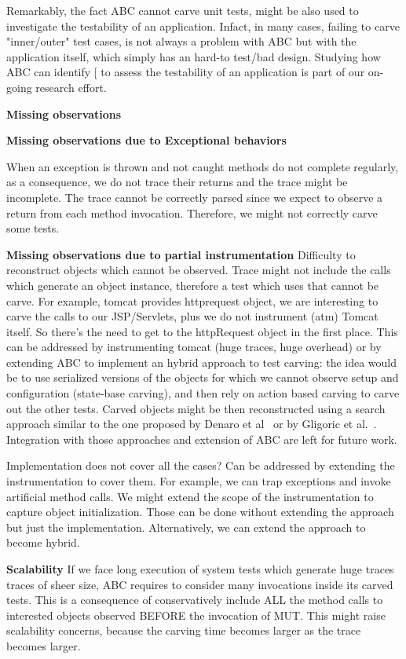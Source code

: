 \documentclass[10pt,conference]{IEEEtran}
\makeatletter
\gdef\xxx{\@ifnextchar[\xxx@lab\xxx@nolab}
\newcommand{\abc}{\textsf{ABC}\xspace}
\makeatother
\begin{document}
{Remarkably, the fact \abc cannot carve unit tests, might be also used to investigate the testability of an application. Infact, in many cases, failing to carve "inner/outer" test cases, is not always a problem with \abc but with the application itself, which simply has an hard-to test/bad design. Studying how \abc can identify \xxx{code smells} to assess the testability of an application is part of our on-going research effort.

\textbf{Missing observations}

\textbf{Missing observations due to Exceptional behaviors}

When an exception is thrown and not caught methods do not complete regularly, as a consequence, we do not trace their returns and the trace might be incomplete. The trace cannot be correctly parsed since we expect to observe a return from each method invocation.  Therefore, we might not correctly carve some tests.

\textbf{Missing observations due to partial instrumentation}
Difficulty to reconstruct objects which cannot be observed. Trace might not include the calls which generate an object instance, therefore a test which uses that cannot be carve. For example, tomcat provides httprequest object, we are interesting to carve the calls to our JSP/Servlets, plus we do not instrument (atm) Tomcat itself. So there's the need to get to the httpRequest object in the first place. This can be addressed by instrumenting tomcat (huge traces, huge overhead) or by extending \abc to implement an hybrid approach to test carving: the idea would be to use serialized versions of the objects for which we cannot observe setup and configuration (state-base carving), and then rely on action based carving to carve out the other tests. Carved objects might be then reconstructed using a search approach similar to the one proposed by Denaro et al~\cite{} or by Gligoric et al.~\cite{}. Integration with those approaches and extension of \abc are left for future work.

Implementation does not cover all the cases? Can be addressed by extending the instrumentation to cover them.
For example, we can trap exceptions and invoke artificial method calls. We might extend the scope of the instrumentation to capture object initialization. Those can be done without extending the approach but just the implementation. Alternatively, we can extend the approach to become hybrid.

\textbf{Scalability}
If we face long execution of system tests which generate huge traces traces of sheer size, \abc requires to consider many invocations inside its carved  tests. This is a consequence of conservatively include ALL the method calls to interested objects observed BEFORE the invocation of MUT.
This might raise scalability concerns, because the carving time becomes larger as the trace becomes larger.

}
\end{document}
